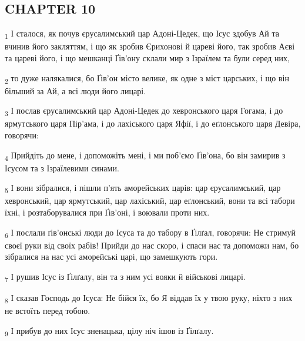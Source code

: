 \subsection{CHAPTER 10}
\begin{tcolorbox}
\textsubscript{1} І сталося, як почув єрусалимський цар Адоні-Цедек, що Ісус здобув Ай та вчинив його закляттям, і що як зробив Єрихонові й цареві його, так зробив Аєві та цареві його, і що мешканці Ґів'ону склали мир з Ізраїлем та були серед них,
\end{tcolorbox}
\begin{tcolorbox}
\textsubscript{2} то дуже налякалися, бо Ґів'он місто велике, як одне з міст царських, і що він більший за Ай, а всі люди його лицарі.
\end{tcolorbox}
\begin{tcolorbox}
\textsubscript{3} І послав єрусалимський цар Адоні-Цедек до хевронського царя Гогама, і до ярмутського царя Пір'ама, і до лахіського царя Яфії, і до еґлонського царя Девіра, говорячи:
\end{tcolorbox}
\begin{tcolorbox}
\textsubscript{4} Прийдіть до мене, і допоможіть мені, і ми поб'ємо Ґів'она, бо він замирив з Ісусом та з Ізраїлевими синами.
\end{tcolorbox}
\begin{tcolorbox}
\textsubscript{5} І вони зібралися, і пішли п'ять аморейських царів: цар єрусалимський, цар хевронський, цар ярмутський, цар лахіський, цар еґлонський, вони та всі табори їхні, і розтаборувалися при Ґів'оні, і воювали проти них.
\end{tcolorbox}
\begin{tcolorbox}
\textsubscript{6} І послали ґів'онські люди до Ісуса та до табору в Ґілґал, говорячи: Не стримуй своєї руки від своїх рабів! Прийди до нас скоро, і спаси нас та допоможи нам, бо зібралися на нас усі аморейські царі, що замешкують гори.
\end{tcolorbox}
\begin{tcolorbox}
\textsubscript{7} І рушив Ісус із Ґілґалу, він та з ним усі вояки й військові лицарі.
\end{tcolorbox}
\begin{tcolorbox}
\textsubscript{8} І сказав Господь до Ісуса: Не бійся їх, бо Я віддав їх у твою руку, ніхто з них не встоїть перед тобою.
\end{tcolorbox}
\begin{tcolorbox}
\textsubscript{9} І прибув до них Ісус зненацька, цілу ніч ішов із Ґілґалу.
\end{tcolorbox}
